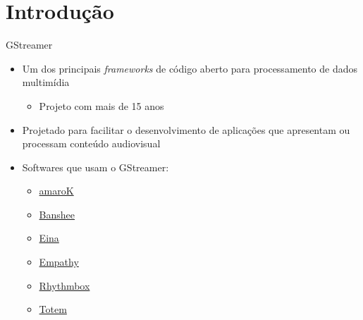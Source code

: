 \documentclass{beamer}
\def\en#1{\foreignlanguage{english}{\emph{#1}}}
\begin{document}
\begin{frame}{\contentsname}
  \tableofcontents
\end{frame}

\section{Introdução}
\label{sub:overview}

\begin{frame}[c]{GStreamer}
  \begin{itemize}
    \item Um dos principais \en{frameworks} de código aberto
      para processamento de dados multimídia
      \begin{itemize}
        \item Projeto com mais de 15 anos
      \end{itemize}
    \item Projetado para facilitar o desenvolvimento de aplicações que apresentam
      ou processam conteúdo audiovisual
    \item Softwares que usam o GStreamer:
      \begin{itemize}
        \item \href{https://amarok.kde.org/}{amaroK}
        \item \href{http://banshee.fm/}{Banshee}
        \item \href{http://eina.sourceforge.net/}{Eina}
        \item \href{https://wiki.gnome.org/Apps/Empathy}{Empathy}
        \item \href{http://www.rhythmbox.org/}{Rhythmbox}
        \item \href{https://wiki.gnome.org/Apps/Videos}{Totem}
      \end{itemize}
  \end{itemize}
\end{frame}
\end{document}
